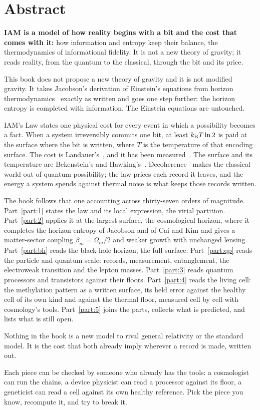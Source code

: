 \chapter*{Abstract}

\textbf{IAM is a model of how reality begins with a bit and the cost that comes with it:} how information and entropy keep their balance, the thermodynamics of informational fidelity. It is not a new theory of gravity; it reads reality, from the quantum to the classical, through the bit and its price.

This book does not propose a new theory of gravity and it is not modified gravity. It takes Jacobson's derivation of Einstein's equations from horizon
thermodynamics~\cite{Jacobson1995} exactly as written and goes one step further: the horizon entropy is completed with information. The Einstein
equations are untouched. \derived

IAM's Law states one physical cost for every event in which a possibility becomes a fact. When a system
irreversibly commits one bit, at least $k_{\mathrm B} T\ln 2$ is paid at the surface where the bit is written, where $T$ is the temperature of that encoding
surface. The cost is Landauer's~\cite{Landauer1961,Bennett1982}, and it has been measured~\cite{Berut2012}. The surface and its temperature are
Bekenstein's and Hawking's~\cite{Bekenstein1973,Hawking1975}. Decoherence~\cite{Zurek2003} makes the classical world out of quantum possibility; the
law prices each record it leaves, and the energy a system spends against thermal noise is what keeps those records written.

The book follows that one accounting across thirty-seven orders of magnitude. Part~\ref{part:1} states the law and its local expression, the virial
partition. Part~\ref{part:2} applies it at the largest surface, the cosmological horizon, where it completes the horizon entropy of Jacobson and of
Cai and Kim and gives a matter-sector coupling $\beta_m=\Omega_m/2$ and weaker growth with unchanged lensing. Part~\ref{part:bh} reads the black-hole
horizon, the full surface. Part~\ref{part:qp} reads the particle and quantum scale: records, measurement, entanglement, the electroweak transition and
the lepton masses. Part~\ref{part:3} reads quantum processors and transistors against their floors. Part~\ref{part:4} reads the living cell: the methylation pattern as a written surface,
its held error against the healthy cell of its own kind and against the thermal floor, measured cell by cell with cosmology's tools.
Part~\ref{part:5} joins the parts, collects what is predicted, and lists what is still open.

Nothing in the book is a new model to rival general relativity or the standard model. It is the cost that both already imply wherever a record is
made, written out.

Each piece can be checked by someone who already has the tools: a cosmologist can run the chains, a device physicist can read a processor against its floor, a geneticist can read a cell against its own healthy reference. Pick the piece you know, recompute it, and try to break it.
